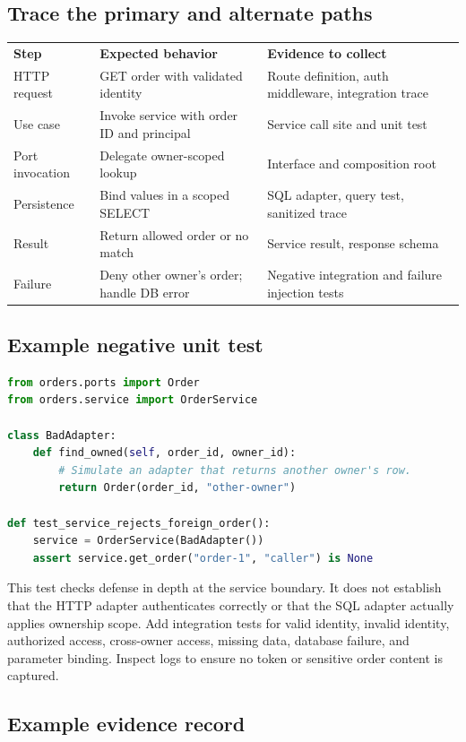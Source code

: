 \documentclass[11pt,letterpaper]{article}
\begin{document}
\subsection{Trace the primary and alternate paths}

\noindent\begin{tabularx}{\linewidth}{@{}P{1.45in}Y Y@{}}
\color{white}\textbf{Step}&\color{white}\textbf{Expected behavior}&\color{white}\textbf{Evidence to collect}\\
HTTP request & GET order with validated identity & Route definition, auth middleware, integration trace\\
Use case & Invoke service with order ID and principal & Service call site and unit test\\
Port invocation & Delegate owner-scoped lookup & Interface and composition root\\
Persistence & Bind values in a scoped SELECT & SQL adapter, query test, sanitized trace\\
Result & Return allowed order or no match & Service result, response schema\\
Failure & Deny other owner's order; handle DB error & Negative integration and failure injection tests\\
\bottomrule
\end{tabularx}
\subsection{Example negative unit test}
\begin{lstlisting}[language=Python]
from orders.ports import Order
from orders.service import OrderService

class BadAdapter:
    def find_owned(self, order_id, owner_id):
        # Simulate an adapter that returns another owner's row.
        return Order(order_id, "other-owner")

def test_service_rejects_foreign_order():
    service = OrderService(BadAdapter())
    assert service.get_order("order-1", "caller") is None
\end{lstlisting}
This test checks defense in depth at the service boundary. It does not establish that the HTTP adapter authenticates correctly or that the SQL adapter actually applies ownership scope. Add integration tests for valid identity, invalid identity, authorized access, cross-owner access, missing data, database failure, and parameter binding. Inspect logs to ensure no token or sensitive order content is captured.
\subsection{Example evidence record}
\end{document}
